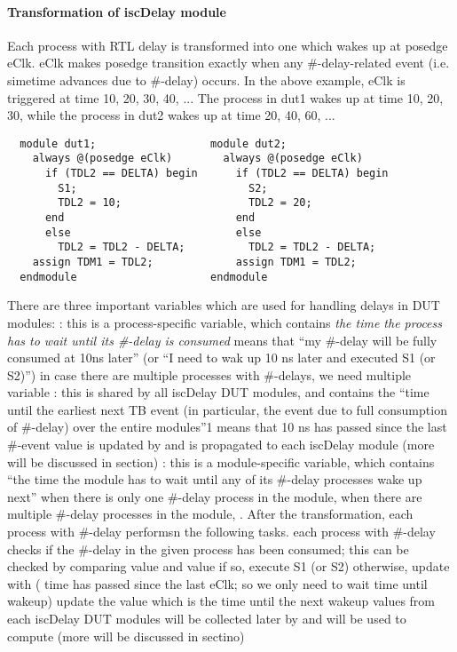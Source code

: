 \documentclass{note}
\begin{document}
\paragraph{Transformation of iscDelay module}
Each process with RTL delay is transformed into one which wakes up at posedge
eClk. eClk makes posedge transition exactly when any \#-delay-related event
(i.e. simetime advances due to \#-delay) occurs. In the above example, eClk is
triggered at time 10, 20, 30, 40, ... The process in dut1 wakes up at time 10,
20, 30, while the process in dut2 wakes up at time 20, 40, 60, ...
\begin{verbatim}
  module dut1;                  module dut2;
    always @(posedge eClk)        always @(posedge eClk)
      if (TDL2 == DELTA) begin      if (TDL2 == DELTA) begin
        S1;                           S2;
        TDL2 = 10;                    TDL2 = 20;
      end                           end
      else                          else
        TDL2 = TDL2 - DELTA;          TDL2 = TDL2 - DELTA;
    assign TDM1 = TDL2;             assign TDM1 = TDL2;
  endmodule                     endmodule
\end{verbatim}
There are three important variables which are used for handling delays in DUT
modules:
\bit
\w {}: this is a process-specific variable, which contains {\em the
  time the process has to wait until its \#-delay is consumed}
  \bit
  \w {} means that ``my \#-delay will be fully consumed at 10ns
  later'' (or ``I need to wak up 10 ns later and executed S1 (or S2)'')
  \w in case there are multiple processes with \#-delays, we need multiple
   variable
  \eit
\w {}: this is shared by all iscDelay DUT modules, and contains the
``time until the earliest next TB event (in particular, the event due to full
consumption of \#-delay) over the entire modules''1
   \bit
   \w {} means that 10 ns has passed since the last \#-event
   \w {} value is updated by  and is propagated to each
   iscDelay module (more will be discussed in  section)
   \eit
\w {}: this is a module-specific variable, which contains ``the time
the module has to wait until any of its \#-delay processes wake up next''
   \bit
   \w when there is only one \#-delay process in the module, 
   \w when there are multiple \#-delay processes in the module, . 
   \eit
\eit
After the transformation, each process with \#-delay performsn the following
tasks.
\ben
\w each process with \#-delay checks if the \#-delay in the given process has
been consumed; this can be checked by comparing  value and 
value
  \bit
  \w if so, execute S1 (or S2)
  \w otherwise, update  with  ( time has
  passed since the last eClk; so we only need to wait  time
  until wakeup)
  \eit
\w update the  value which is the time until the next wakeup
  \bit
  \w {} values from each iscDelay DUT modules will be collected later
  by  and will be used to compute  (more will be
  discussed in  sectino)
  \eit
\een
\end{document}
